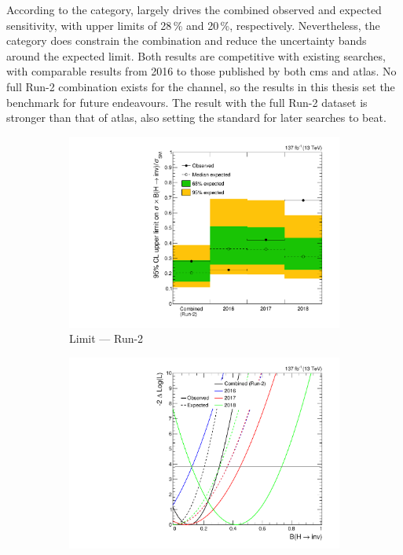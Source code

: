 According to the category, \VH largely drives the combined observed and expected sensitivity, with upper limits of 28\,\% and 20\,\%, respectively. Nevertheless, the \ttH category does constrain the combination and reduce the uncertainty bands around the expected limit. Both results are competitive with existing searches, with comparable results from 2016 to those published by both \acrshort{cms} and \acrshort{atlas}. No full Run-2 combination exists for the \VH channel, so the results in this thesis set the benchmark for future endeavours. The \ttH result with the full Run-2 dataset is stronger than that of \acrshort{atlas}, also setting the standard for later searches to beat.

\begin{figure}[htbp]
    \centering
    \begin{subfigure}[t]{0.45\textwidth}
        \includegraphics[width=\textwidth]{figures/limits/full_Run2/limit_Run2_comb_per_year.pdf}
        \caption{Limit --- Run-2}
    \end{subfigure}
    \hspace{0.05\textwidth}
    \begin{subfigure}[t]{0.45\textwidth}
        \includegraphics[width=\textwidth]{figures/likelihood_scan/profile_likelihood_scan_Run2_per_year.pdf}

\end{subfigure}
\end{figure}
